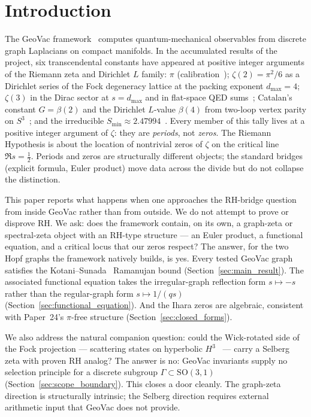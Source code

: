 \documentclass[11pt]{article}
\begin{document}
\section{Introduction}

The GeoVac framework~\cite{paper1,paper7} computes quantum-mechanical
observables from discrete graph Laplacians on compact manifolds.  In
the accumulated results of the project, six transcendental constants
have appeared at positive integer arguments of the Riemann zeta and
Dirichlet $L$ family:
$\pi$ (calibration~\cite{paper18});
$\zeta(2)=\pi^2/6$ as a Dirichlet series of the Fock degeneracy lattice
at the packing exponent $d_{\max}=4$;
$\zeta(3)$ in the Dirac sector at $s=d_{\max}$ and in flat-space QED
sums~\cite{paper28};
Catalan's constant $G=\beta(2)$ and the Dirichlet $L$-value $\beta(4)$
from two-loop vertex parity on $S^3$~\cite{paper28}; and
the irreducible $S_{\min}\approx 2.47994$~\cite{paper28}.
Every member of this tally lives at a positive integer argument of
$\zeta$: they are \emph{periods}, not \emph{zeros}.  The Riemann
Hypothesis is about the location of nontrivial zeros of $\zeta$ on
the critical line $\Re s = \tfrac12$.  Periods and zeros are
structurally different objects; the standard bridges (explicit
formula, Euler product) move data across the divide but do not
collapse the distinction.

This paper reports what happens when one approaches the RH-bridge
question from inside GeoVac rather than from outside.  We do not
attempt to prove or disprove RH.  We ask: does the framework contain,
on its own, a graph-zeta or spectral-zeta object with an RH-type
structure --- an Euler product, a functional equation, and a critical
locus that our zeros respect?  The answer, for the two Hopf graphs
the framework natively builds, is yes.  Every tested GeoVac graph
satisfies the Kotani--Sunada~\cite{kotani2000} Ramanujan bound
(Section~\ref{sec:main_result}).  The associated functional equation
takes the irregular-graph reflection form $s\mapsto -s$ rather than
the regular-graph form $s\mapsto 1/(q s)$
(Section~\ref{sec:functional_equation}).  And the Ihara zeros are
algebraic, consistent with Paper~24's $\pi$-free structure
(Section~\ref{sec:closed_forms}).

We also address the natural companion question: could the Wick-rotated
side of the Fock projection --- scattering states on hyperbolic
$H^3$~\cite{bander1966} --- carry a Selberg zeta with proven RH analog?
The answer is no: GeoVac invariants supply no selection principle for
a discrete subgroup $\Gamma\subset\mathrm{SO}(3,1)$
(Section~\ref{sec:scope_boundary}).  This closes a door cleanly.  The
graph-zeta direction is structurally intrinsic; the Selberg direction
requires external arithmetic input that GeoVac does not provide.
\end{document}
